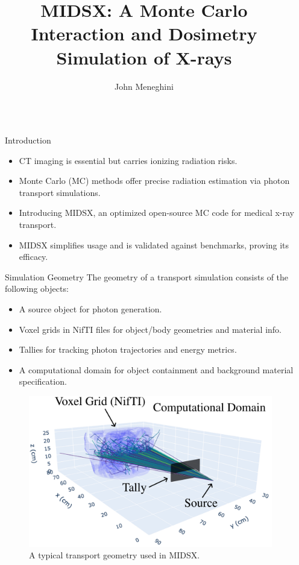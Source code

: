 \documentclass[final]{beamer}
\title{\fontsize{80pt}{16pt}\selectfont MIDSX: A Monte Carlo Interaction and Dosimetry Simulation of X-rays}
\author{John Meneghini}
\institute[shortinst]{Department of Physics, Saint Vincent College, Latrobe, PA 15650}
\newlength{\sepwidth}
\newlength{\colwidth}
\newcommand{\separatorcolumn}{\begin{column}{\sepwidth}\end{column}}
\begin{document}
\begin{frame}[t]
\begin{columns}[t]
\separatorcolumn

\begin{column}{\colwidth}
  \begin{block}{Introduction}
    \vspace{-0.4\baselineskip}
    \begin{itemize}[label=\textbullet]
        \item CT imaging is essential but carries ionizing radiation risks.
        \item Monte Carlo (MC) methods offer precise radiation estimation via photon transport simulations.
        \item Introducing MIDSX, an optimized open-source MC code for medical x-ray transport.
        \item MIDSX simplifies usage and is validated against benchmarks, proving its efficacy.
    \end{itemize}
    \vspace{-\baselineskip}
  \end{block}

  \begin{block}{Simulation Geometry}
    The geometry of a transport simulation consists of the following objects:
    \begin{itemize}[label=\textbullet]
      \item A source object for photon generation.
      \item Voxel grids in NifTI files for object/body geometries and material info.
      \item Tallies for tracking photon trajectories and energy metrics.
      \item A computational domain for object containment and background material specification.
    \end{itemize}

    \begin{figure}
      \centering
      \includegraphics[width = 1\colwidth]{comp_domain.pdf}
      \caption{A typical transport geometry used in MIDSX.}
    \end{figure}
    \vspace{-\baselineskip}
  \end{block}


\end{column}
\end{columns}
\end{frame}
\end{document}
